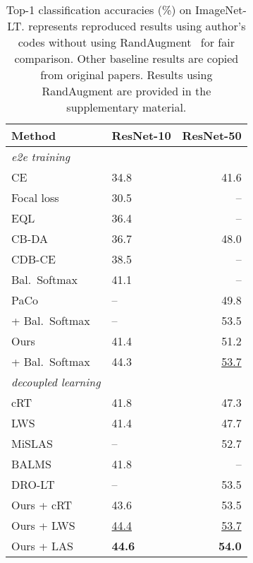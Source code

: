 \documentclass[10pt,twocolumn,letterpaper]{article}
\begin{document}
\begin{table}
  \begin{center}
    {\small{
\begin{tabular}{llr}
\toprule
         Method & ResNet-10 & ResNet-50 \\
         \midrule
         \textit{e2e training} \\
         CE  & 34.8 & 41.6 \\
         Focal loss~\cite{focalloss} & 30.5 & -- \\
EQL~\cite{eqlloss}  & 36.4 & --\\
         CB-DA\cite{jamal} & 36.7 & 48.0\\
         CDB-CE~\cite{cdb-ce} & 38.5 & --\\
          Bal.~Softmax~\cite{BALMS} & 41.1 & --\\
         PaCo~\cite{PaCo}  & -- &  49.8\\
         \hspace{0.2mm} + Bal.~Softmax~\cite{BALMS} & -- & 53.5\\ 
         Ours & 41.4 & 51.2 \\
         \hspace{0.2mm} + Bal.~Softmax & 44.3 & \underline{53.7} \\
         \hline
         \textit{decoupled learning}\\


         cRT~\cite{decoupling}  & 41.8 & 47.3 \\
         LWS~\cite{decoupling}  & 41.4 & 47.7 \\
         MiSLAS~\cite{mislas}  & -- & 52.7 \\
         BALMS~\cite{BALMS}  & 41.8 & -- \\
         DRO-LT~\cite{dro-lt}  & -- & 53.5 \\
         Ours + cRT & 43.6 & 53.5 \\
         Ours + LWS & \underline{44.4} & \underline{53.7} \\
         Ours + LAS & \textbf{44.6} & \textbf{54.0}\\
         \bottomrule

\end{tabular}
}}
\end{center}
\caption{Top-1 classification accuracies (\%) on ImageNet-LT.  represents reproduced results using author's codes without using RandAugment~\cite{randaugment} for fair comparison. Other baseline results are copied from original papers. Results using RandAugment
are provided in the supplementary
material.
}
  \label{tab:ImageNet-LT results}
\end{table}
\end{document}
